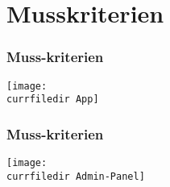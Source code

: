 \section{Musskriterien}

\begin{frame}\frametitle{Muss-kriterien}
    \begin{center}
    \texttt{[image: \\currfiledir App]}
    \end{center}
\end{frame}

\begin{frame}\frametitle{Muss-kriterien}
    \begin{center}
    \texttt{[image: \\currfiledir Admin-Panel]}
    \end{center}
\end{frame}

